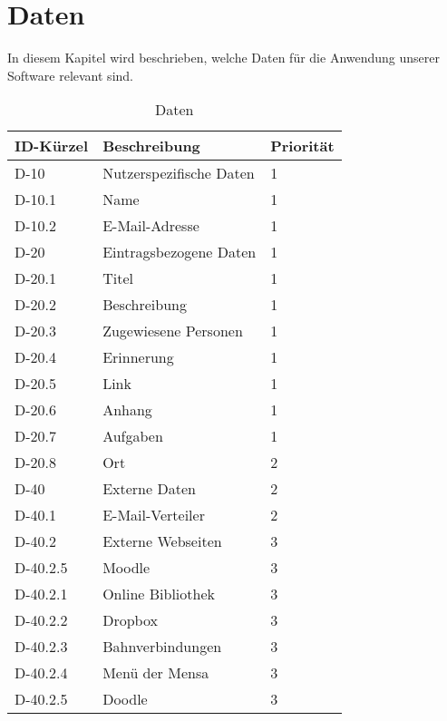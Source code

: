 
\chapter{Daten}

In diesem Kapitel wird beschrieben, welche Daten für die Anwendung unserer Software relevant sind.\\
\begin{longtable}{|l|p{5cm}|l|}
    \toprule
    \textbf{ID-Kürzel} & \textbf{Beschreibung} & \textbf{Priorität}\\
    \hline
    \endhead
    \hline
    \caption{Daten}
    \endfoot
 

    D-10 & Nutzerspezifische Daten & 1\\
    D-10.1 & Name &1\\
    D-10.2 & E-Mail-Adresse &1 \\       
    \hline
    D-20 & Eintragsbezogene Daten & 1\\
    D-20.1 & Titel &1\\
    D-20.2 & Beschreibung & 1\\
    D-20.3 & Zugewiesene Personen & 1\\
    D-20.4 & Erinnerung &1\\
    D-20.5 & Link &1\\
    D-20.6 & Anhang &1\\
    D-20.7 & Aufgaben & 1\\
    D-20.8 & Ort &  2\\
    \hline
    D-40 & Externe Daten & 2\\
    D-40.1 & E-Mail-Verteiler & 2\\
    D-40.2 & Externe Webseiten & 3 \\
    D-40.2.5 & Moodle & 3\\        
    D-40.2.1 & Online Bibliothek & 3\\
    D-40.2.2 & Dropbox & 3 \\
    D-40.2.3 & Bahnverbindungen & 3\\
    D-40.2.4 & Menü der Mensa & 3\\
    D-40.2.5 & Doodle & 3\\        
    \hline
\end{longtable}


